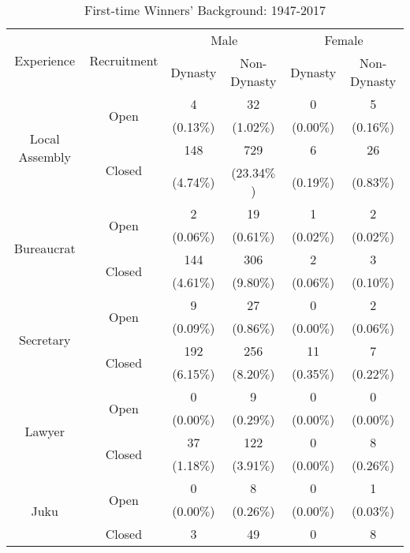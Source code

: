 
\begin{table}[H]
\caption{First-time Winners' Background: 1947-2017}
\label{table:summaryBackgroundWinners}
\centering
\begin{threeparttable}
  \begin{tabular}{cccccc} \toprule[1.5pt]
    \multirow{2}{*}{Experience} & \multirow{2}{*}{Recruitment} & \multicolumn{2}{c}{Male} & \multicolumn{2}{c}{Female} \\ \cmidrule{3-6}
    & & Dynasty & Non-Dynasty & Dynasty & Non-Dynasty \\ \midrule
    \multirow{4}{*}{Local Assembly} & \multirow{2}{*}{Open} & 4 & 32 & 0 & 5 \\
    & & (0.13$\%$) & (1.02$\%$) & (0.00$\%$) & (0.16$\%$) \\
    & \multirow{2}{*}{Closed} & 148 & 729 & 6 & 26 \\
    & & (4.74$\%$) & (23.34$\%$) & (0.19$\%$) & (0.83$\%$) \\ \midrule[0.7pt]
    \multirow{4}{*}{Bureaucrat} & \multirow{2}{*}{Open} & 2 & 19 & 1 & 2 \\
    & & (0.06$\%$) & (0.61$\%$) & (0.02$\%$) & (0.02$\%$) \\
    & \multirow{2}{*}{Closed} & 144 & 306 & 2 & 3 \\
    & & (4.61$\%$) & (9.80$\%$) & (0.06$\%$) & (0.10$\%$) \\ \midrule[0.7pt]
    \multirow{4}{*}{Secretary} & \multirow{2}{*}{Open} & 9 & 27 & 0 & 2 \\
    & & (0.09$\%$) & (0.86$\%$) & (0.00$\%$) & (0.06$\%$) \\
    & \multirow{2}{*}{Closed} & 192 & 256 & 11 & 7 \\
    & & (6.15$\%$) & (8.20$\%$) & (0.35$\%$) & (0.22$\%$) \\ \midrule[0.7pt]
    \multirow{4}{*}{Lawyer} & \multirow{2}{*}{Open} & 0 & 9 & 0 & 0 \\
    & & (0.00$\%$) & (0.29$\%$) & (0.00$\%$) & (0.00$\%$) \\
    & \multirow{2}{*}{Closed} & 37 & 122 & 0 & 8 \\
    & & (1.18$\%$) & (3.91$\%$) & (0.00$\%$) & (0.26$\%$) \\ \midrule[0.7pt]
    \multirow{4}{*}{Juku} & \multirow{2}{*}{Open} & 0 & 8 & 0 & 1 \\
    & & (0.00$\%$) & (0.26$\%$) & (0.00$\%$) & (0.03$\%$) \\ 
    & \multirow{2}{*}{Closed} & 3 & 49 & 0 & 8 \\

\end{tabular}
\end{threeparttable}
\end{table}

